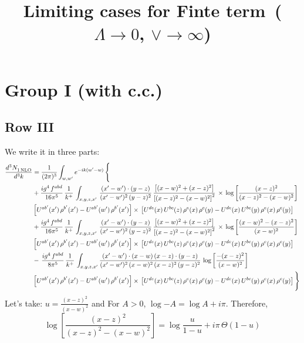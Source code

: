 \documentclass[9pt]{article}
\title{Limiting cases for Finte term\, ($\Lambda\to 0$, $\vee\to \infty$)}
\author{}
\date{}
\numberwithin{equation}{section}
\begin{document}
\maketitle
\section{Group I (with c.c.)}
\subsection{Row III}
We write it in three parts:
\begin{align}
   \frac{d^{3}N_{1\,\rm NLO}^{\rm}}{d^{3}k}  & =  \frac{1}{(2\pi)^{3}}  \int_{w, w^\prime} e^{-ik(w^\prime-w)}\, \Bigg\{\notag \\
&  +\frac{ig^{4}\,f^{abd}}{16\pi^{5}}\, \frac{1}{k^{+}}\,\int_{x,y,z,x'}\, \frac{(x'-w')\cdot (y-z)}{(x'-w')^{2}\,(y-z)^{2}}\, \frac{\left[(x-w)^{2}+(x-z)^{2}\right]}{\left[(x-z)^{2}-(x-w)^{2}\right]^{2}}\, \times\, \log{\left[\frac{(x-z)^{2}}{(x-z)^{2}-(x-w)^{2}}\right]}\notag \\ & \left[U^{ab'}(x')\,\rho^{b'}(x')-U^{ab'}(w')\, \rho^{b'}(x')\right]\times\, \left[U^{de}(x)\,U^{bc}(z)\, \rho^{e}(x)\,\rho^{c}(y)-U^{de}(x)\,U^{bc}(y)\,\rho^{e}(x)\,\rho^{c}(y)\right] \notag \\
&  +\frac{ig^{4}\,f^{abd}}{16\pi^{5}}\, \frac{1}{k^{+}}\,\int_{x,y,z,x'}\, \frac{(x'-w')\cdot (y-z)}{(x'-w')^{2}\,(y-z)^{2}}\, \frac{\left[(x-w)^{2}+(x-z)^{2}\right]}{\left[(x-z)^{2}-(x-w)^{2}\right]^{2}}\, \times\, \log{\left[\frac{(x-w)^{2}-(x-z)^{2}}{(x-w)^{2}}\right]}\notag \\ & \left[U^{ab'}(x')\,\rho^{b'}(x')-U^{ab'}(w')\, \rho^{b'}(x')\right]\times\, \left[U^{de}(x)\,U^{bc}(z)\, \rho^{e}(x)\,\rho^{c}(y)-U^{de}(x)\,U^{bc}(y)\,\rho^{e}(x)\,\rho^{c}(y)\right] \notag \\
&-\, \frac{ig^{4}\,f^{abd}}{8\pi^{5}}\,\frac{1}{k^{+}}\,\int_{x,y,z,x'}\frac{(x'-w')\cdot (x-w)\, (x-z)\cdot (y-z)}{(x'-w')^{2}\, (x-w)^{2}\, (x-z)^{2}\, (y-z)^{2}}\,\log{\left[\frac{-(x-z)^{2}}{(x-w)^{2}}\right]} \notag \\ & \left[U^{ab'}(x')\,\rho^{b'}(x')-U^{ab'}(w')\, \rho^{b'}(x')\right]\times\, \left[U^{de}(x)\,U^{bc}(z)\, \rho^{e}(x)\,\rho^{c}(y)-U^{de}(x)\,U^{bc}(y)\,\rho^{e}(x)\,\rho^{c}(y)\right]\Bigg\}
\end{align}
Let's take: $u = \frac{(x-z)^{2}}{(x-w)^{2}}$ and For $A > 0$, $\log{-A} = \log{A} + i\pi$. Therefore,
$$ \log{\left[\frac{(x-z)^{2}}{(x-z)^{2}-(x-w)^{2}}\right]} = \log{\frac{u}{1-u}} + i\pi\,\Theta(1-u)$$
\end{document}
